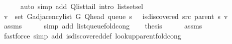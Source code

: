 \begin{isabellebody}
\ \ \ \ \isamarkupfalse%
\ {\isacharparenleft}{\kern0pt}auto\ simp\ add{\isacharcolon}{\kern0pt}\ Q{\isachardot}{\kern0pt}list{\isacharunderscore}{\kern0pt}tail\ intro{\isacharcolon}{\kern0pt}\ list{\isachardot}{\kern0pt}set{\isacharunderscore}{\kern0pt}sel{\isacharparenleft}{\kern0pt}{}{\isacharparenright}{\kern0pt}{\isacharparenright}{\kern0pt}\isanewline
\ \ \isamarkupfalse%
\ {\isachardoublequoteopen}v\ {\isasymin}\ set\ {\isacharparenleft}{\kern0pt}G{\isachardot}{\kern0pt}adjacency{\isacharunderscore}{\kern0pt}list\ G\ {\isacharparenleft}{\kern0pt}Q{\isacharunderscore}{\kern0pt}head\ {\isacharparenleft}{\kern0pt}queue\ s{\isacharparenright}{\kern0pt}{\isacharparenright}{\kern0pt}{\isacharparenright}{\kern0pt}\ {\isasymand}\ {\isasymnot}\ is{\isacharunderscore}{\kern0pt}discovered\ src\ {\isacharparenleft}{\kern0pt}parent\ s{\isacharparenright}{\kern0pt}\ v{\isachardoublequoteclose}\isanewline
\ \ \ \ \isamarkupfalse%
\ assms\isanewline
\ \ \ \ \isamarkupfalse%
\ {\isacharparenleft}{\kern0pt}simp\ add{\isacharcolon}{\kern0pt}\ list{\isacharunderscore}{\kern0pt}queue{\isacharunderscore}{\kern0pt}fold{\isacharunderscore}{\kern0pt}cong{\isacharparenright}{\kern0pt}\isanewline
\ \ \isamarkupfalse%
\ {\isacharquery}{\kern0pt}thesis\isanewline
\ \ \ \ \isamarkupfalse%
\ assms\isanewline
\ \ \ \ \isamarkupfalse%
\ {\isacharparenleft}{\kern0pt}fastforce\ simp\ add{\isacharcolon}{\kern0pt}\ is{\isacharunderscore}{\kern0pt}discovered{\isacharunderscore}{\kern0pt}def\ lookup{\isacharunderscore}{\kern0pt}parent{\isacharunderscore}{\kern0pt}fold{\isacharunderscore}{\kern0pt}cong{\isacharparenright}{\kern0pt}\isanewline
{}\isamarkupfalse%
%
\endisatagproof
{\isafoldproof}%
%
\isadelimproof
%
\endisadelimproof
%
\begin{isamarkuptext}%

\end{isamarkuptext}
\end{isabellebody}
